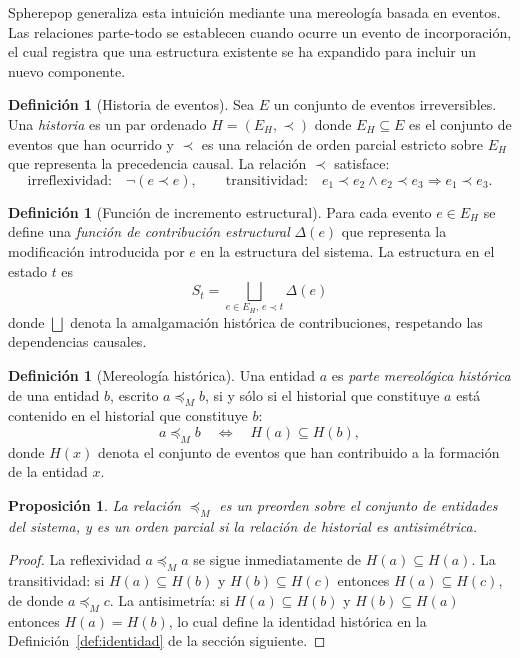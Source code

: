 \documentclass[12pt]{article}
\theoremstyle{plain}
\newtheorem{proposition}[theorem]{Proposición}
\theoremstyle{definition}
\newtheorem{definition}[theorem]{Definición}
\begin{document}
Spherepop generaliza esta intuición mediante una mereología basada en eventos. Las relaciones parte-todo se establecen cuando ocurre un evento de incorporación, el cual registra que una estructura existente se ha expandido para incluir un nuevo componente.

\begin{definition}[Historia de eventos]
\label{def:historia}
Sea $E$ un conjunto de eventos irreversibles. Una \emph{historia} es un par ordenado $H = (E_H, \prec)$ donde $E_H \subseteq E$ es el conjunto de eventos que han ocurrido y $\prec$ es una relación de orden parcial estricto sobre $E_H$ que representa la precedencia causal. La relación $\prec$ satisface:
\[
\text{irreflexividad:}\quad \neg(e \prec e), \qquad
\text{transitividad:}\quad e_1 \prec e_2 \land e_2 \prec e_3 \Rightarrow e_1 \prec e_3.
\]
\end{definition}

\begin{definition}[Función de incremento estructural]
\label{def:delta}
Para cada evento $e \in E_H$ se define una \emph{función de contribución estructural} $\Delta(e)$ que representa la modificación introducida por $e$ en la estructura del sistema. La estructura en el estado $t$ es
\[
S_t = \bigsqcup_{e \in E_H,\, e \prec t} \Delta(e)
\]
donde $\bigsqcup$ denota la amalgamación histórica de contribuciones, respetando las dependencias causales.
\end{definition}

\begin{definition}[Mereología histórica]
\label{def:mereologia}
Una entidad $a$ es \emph{parte mereológica histórica} de una entidad $b$, escrito $a \preceq_M b$, si y sólo si el historial que constituye $a$ está contenido en el historial que constituye $b$:
\[
a \preceq_M b \quad\Longleftrightarrow\quad H(a) \subseteq H(b),
\]
donde $H(x)$ denota el conjunto de eventos que han contribuido a la formación de la entidad $x$.
\end{definition}

\begin{proposition}
\label{prop:mereologia_preorden}
La relación $\preceq_M$ es un preorden sobre el conjunto de entidades del sistema, y es un orden parcial si la relación de historial es antisimétrica.
\end{proposition}

\begin{proof}
La reflexividad $a \preceq_M a$ se sigue inmediatamente de $H(a) \subseteq H(a)$. La transitividad: si $H(a) \subseteq H(b)$ y $H(b) \subseteq H(c)$ entonces $H(a) \subseteq H(c)$, de donde $a \preceq_M c$. La antisimetría: si $H(a) \subseteq H(b)$ y $H(b) \subseteq H(a)$ entonces $H(a) = H(b)$, lo cual define la identidad histórica en la Definición~\ref{def:identidad} de la sección siguiente.
\end{proof}
\end{document}
